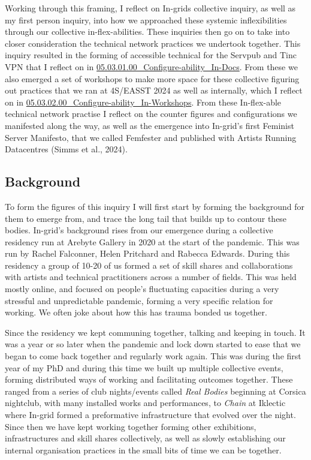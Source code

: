 Working through this framing, I reflect on In-grids collective inquiry,
as well as my first person inquiry, into how we approached these
systemic inflexibilities through our collective in-flex-abilities. These
inquiries then go on to take into closer consideration the technical
network practices we undertook together. This inquiry resulted in the
forming of accessible technical for the Servpub and Tinc VPN that I
reflect on in
\href{05.03.01.00_Configure-ability_In-Docs.md}{05.03.01.00\_Configure-ability\_In-Docs}.
From these we also emerged a set of workshops to make more space for
these collective figuring out practices that we ran at 4S/EASST 2024 as
well as internally, which I reflect on in
\href{05.03.02.00_Configure-ability_In-Workshops.md}{05.03.02.00\_Configure-ability\_In-Workshops}.
From these In-flex-able technical network practise I reflect on the
counter figures and configurations we manifested along the way, as well
as the emergence into In-grid's first Feminist Server Manifesto, that we
called Femfester and published with Artists Running Datacentres (Simms
et al., 2024).

\hypertarget{background}{%
\subsection[Background]{\texorpdfstring{\protect\hypertarget{anchor}{}{}Background}{Background}}\label{background}}

To form the figures of this inquiry I will first start by forming the
background for them to emerge from, and trace the long tail that builds
up to contour these bodies. In-grid's background rises from our
emergence during a collective residency run at Arebyte Gallery in 2020
at the start of the pandemic. This was run by Rachel Falconner, Helen
Pritchard and Rabecca Edwards. During this residency a group of 10-20 of
us formed a set of skill shares and collaborations with artists and
technical practitioners across a number of fields. This was held mostly
online, and focused on people's fluctuating capacities during a very
stressful and unpredictable pandemic, forming a very specific relation
for working. We often joke about how this has trauma bonded us together.

Since the residency we kept communing together, talking and keeping in
touch. It was a year or so later when the pandemic and lock down started
to ease that we began to come back together and regularly work again.
This was during the first year of my PhD and during this time we built
up multiple collective events, forming distributed ways of working and
facilitating outcomes together. These ranged from a series of club
nights/events called \emph{Real Bodies} beginning at Corsica nightclub,
with many installed works and performances, to \emph{Chain} at Iklectic
where In-grid formed a preformative infrastructure that evolved over the
night. Since then we have kept working together forming other
exhibitions, infrastructures and skill shares collectively, as well as
slowly establishing our internal organisation practices in the small
bits of time we can be together.


